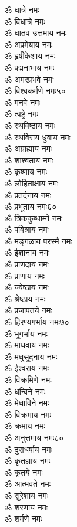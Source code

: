 \begin{multicols}{2}
\begin{flushleft}
ॐ धात्रे नमः\\
ॐ विधात्रे नमः\\
ॐ धातव उत्तमाय नमः\\
ॐ अप्रमेयाय नमः\\
ॐ हृषीकेशाय नमः\\
ॐ पद्मनाभाय नमः\\
ॐ अमरप्रभवे नमः\\
ॐ विश्वकर्मणे नमः\hfill ५०\\
ॐ मनवे नमः\\
ॐ त्वष्ट्रे नमः\\
ॐ स्थविष्ठाय नमः\\
ॐ स्थविराय ध्रुवाय नमः\\
ॐ अग्राह्याय नमः\\
ॐ शाश्वताय नमः\\
ॐ कृष्णाय नमः\\
ॐ लोहिताक्षाय नमः\\
ॐ प्रतर्दनाय नमः\\
ॐ प्रभूताय नमः\hfill ६०\\
ॐ त्रिककुब्धाम्ने नमः\\
ॐ पवित्राय  नमः\\
ॐ मङ्गळाय परस्मै नमः\\
ॐ ईशानाय नमः\\
ॐ प्राणदाय नमः\\
ॐ प्राणाय नमः\\
ॐ ज्येष्ठाय नमः\\
ॐ श्रेष्ठाय नमः\\
ॐ प्रजापतये नमः\\
ॐ हिरण्यगर्भाय नमः\hfill ७०\\
ॐ भूगर्भाय नमः\\
ॐ माधवाय नमः\\
ॐ मधुसूदनाय नमः\\
ॐ ईश्वराय नमः\\
ॐ विक्रमिणे नमः\\
ॐ धन्विने नमः\\
ॐ मेधाविने नमः\\
ॐ विक्रमाय नमः\\
ॐ क्रमाय नमः\\
ॐ अनुत्तमाय नमः\hfill ८०\\
ॐ दुराधर्षाय नमः\\
ॐ कृतज्ञाय नमः\\
ॐ कृतये नमः\\
ॐ आत्मवते नमः\\
ॐ सुरेशाय नमः\\
ॐ शरणाय नमः\\
ॐ शर्मणे नमः\\

\end{flushleft}
\end{multicols}
